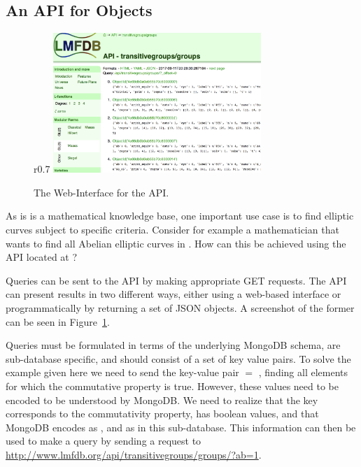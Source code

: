 \subsection{An API for \lmfdb Objects}\label{sec:sota:api}

\begin{figure}r{0.7\textwidth}\centering\vspace*{-2.5em}
  \includegraphics[width=0.7\textwidth]{APIScreenshot}\vspace*{-em}
  \caption[The Web-Interface for the \lmfdb API. ]{
    The Web-Interface for the \lmfdb API. 
  }\vspace*{-1.5em}
  \label{fig:apiscreenshot}
\end{figure}
As \lmfdb is is a mathematical knowledge base, one important use case is to find elliptic curves subject to specific criteria. 
Consider for example a mathematician that wants to find all Abelian elliptic curves in \lmfdb. 
How can this be achieved using the \lmfdb API located at \cite{lmfdbapi}? 

Queries can be sent to the API by making appropriate GET requests. 
The \lmfdb API can present results in two different ways, either using a web-based interface or programmatically by returning a set of JSON objects. 
A screenshot of the former can be seen in Figure~\ref{fig:apiscreenshot}. 

Queries must be formulated in terms of the underlying MongoDB schema, are sub-database specific, and should consist of a set of key value pairs. 
To solve the example given here we need to send the key-value pair $ = $ , finding all elements for which the commutative property is true. 
However, these values need to be encoded to be understood by MongoDB. 
We need to realize that the  key corresponds to the commutativity property, has boolean values, and that MongoDB encodes  as , and  as  in this \lmfdb sub-database. 
This information can then be used to make a query by sending a request to \url{http://www.lmfdb.org/api/transitivegroups/groups/?ab=1}. 

